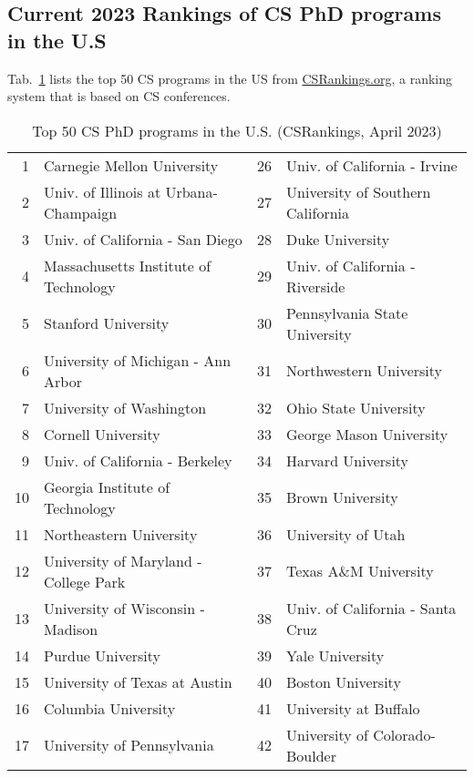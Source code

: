 \documentclass[11pt]{article}
\begin{document}
\subsection{Current 2023 Rankings of CS PhD programs in the U.S}\label{sec:ranking}
  Tab.~\ref{tab:ranking} lists the top 50 CS programs in the US from \href{https://www.csrankings.org}{CSRankings.org}, a ranking system that is based on CS conferences.
  
  \begin{table}[ht!]
    \centering
    \small
    \caption{Top 50 CS PhD programs in the U.S. (CSRankings, April 2023)}\label{tab:ranking}
  \begin{tabular}{rl|rl}
    \toprule
    1 & Carnegie Mellon University & 26 & Univ. of California - Irvine \\
    2 & Univ. of Illinois at Urbana-Champaign  & 27 & University of Southern California \\
    3 & Univ. of California - San Diego & 28 &  Duke University \\
    4 & Massachusetts Institute of Technology & 29 & Univ. of California - Riverside\\
    5 & Stanford University         & 30 & Pennsylvania State University \\
    6 & University of Michigan - Ann Arbor & 31 & Northwestern University \\
    7 & University of Washington   & 32& Ohio State University \\  
    8 & Cornell University       &33 & George Mason University \\
    9 & Univ. of California - Berkeley  &34& Harvard University  \\
    10 & Georgia Institute of Technology &35& Brown University  \\
    11 & Northeastern University  &36& University of Utah \\
    12 & University of Maryland - College Park &37& Texas A\&M University\\
    13 & University of Wisconsin - Madison  &38& Univ. of California - Santa Cruz  \\
    14 &   Purdue University  &39 & Yale University  \\
    15 & University of Texas at Austin  &40& Boston University \\
    16 &   Columbia University  &41 & University at Buffalo\\
    17 & University of Pennsylvania &42& University of Colorado-Boulder \\

\end{tabular}
\end{table}
\end{document}
